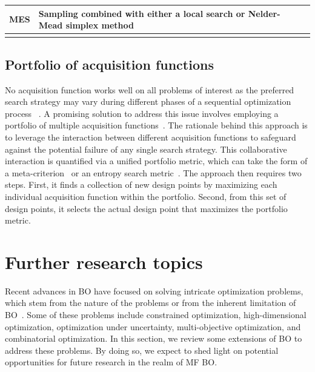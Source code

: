 \documentclass[iicol,sn-basic]{sn-jnl}%
\theoremstyle{thmstyleone}%
\theoremstyle{thmstyletwo}
\theoremstyle{thmstylethree}
\begin{document}
\begin{linenumbers}
\begin{table}
\begin{tabularx}{\textwidth}{lXX}
		MES & Sampling combined with either a local search or Nelder-Mead simplex method& \cite{ZWang2017}\\
		\hline \noalign{\smallskip}
		
	\end{tabularx}
\end{table}

\subsection{Portfolio of acquisition functions}\label{Sec64}

No acquisition function works well on all problems of interest as the preferred search strategy may vary during different phases of a sequential optimization process ~\citep{Shahriari2016}.
A promising solution to address this issue involves employing a portfolio of multiple acquisition functions~\citep{Hoffman2014,Shahriari2014}.
The rationale behind this approach is to leverage the interaction between different acquisition functions to safeguard against the potential failure of any single search strategy.
This collaborative interaction is quantified via a unified portfolio metric, which can take the form of a meta-criterion~\citep{Hoffman2014} or an entropy search metric~\citep{Shahriari2014}.
The approach then requires two steps.
First, it finds a collection of new design points by maximizing each individual acquisition function within the portfolio.
Second, from this set of design points, it selects the actual design point that maximizes the portfolio metric.

\section{Further research topics}\label{Sec7}

Recent advances in BO have focused on solving intricate optimization problems, which stem from the nature of the problems or from the inherent limitation of BO~\citep{Wang2023}.  
Some of these problems include constrained optimization, high-dimensional optimization, optimization under uncertainty, multi-objective optimization, and combinatorial optimization.  
In this section, we review some extensions of BO to address these problems.
By doing so, we expect to shed light on potential opportunities for future research in the realm of MF BO.

\end{linenumbers}
\end{document}
